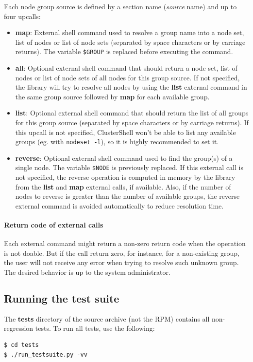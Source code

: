 \documentclass[english,a4paper]{csuserguide}
\begin{document}
Each node group source is defined by a section name (\textit{source} name) and up to four upcalls:
\begin{itemize}
\item{\textbf{map}: External shell command used to resolve a group name into a node set, list of nodes or list of node sets (separated by space characters or by carriage returns). The variable \verb+$GROUP+ is replaced before executing the command.}
\item{\textbf{all}: Optional external shell command that should return a node set, list of nodes or list of node sets of all nodes for this group source. If not specified, the library will try to resolve all nodes by using the \textbf{list} external command in the same group source followed by \textbf{map} for each available group.}
\item{\textbf{list}: Optional external shell command that should return the list of all groups for this group source (separated by space characters or by carriage returns). If this upcall is not specified, ClusterShell won't be able to list any available groups (eg. with \texttt{nodeset -l}), so it is highly recommended to set it.}
\item{\textbf{reverse}: Optional external shell command used to find the group(s) of a single node. The variable \verb+$NODE+ is previously replaced. If this external call is not specified, the reverse operation is computed in memory by the library from the \textbf{list} and \textbf{map} external calls, if available. Also, if the number of nodes to reverse is greater than the number of available groups, the reverse external command is avoided automatically to reduce resolution time.}
\end{itemize}

\paragraph{Return code of external calls}
Each external command might return a non-zero return code when the operation is not doable. But if the call return zero, for instance, for a non-existing group, the user will not receive any error when trying to resolve such unknown group. The desired behavior is up to the system administrator. 

\subsection{Running the test suite}

The \textbf{tests} directory of the source archive (not the RPM) contains all non-regression tests. To run all tests, use the following:
\begin{verbatim}
$ cd tests
$ ./run_testsuite.py -vv
\end{verbatim}
\end{document}
